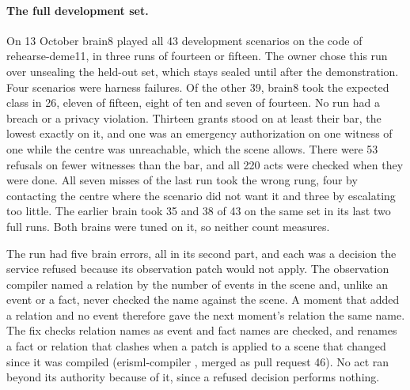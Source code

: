 \paragraph{The full development set.} On 13 October brain8 played all 43 development scenarios
on the code of rehearse-deme11, in three runs of fourteen or fifteen. The owner chose this run over
unsealing the held-out set, which stays sealed until after the demonstration. Four scenarios were
harness failures. Of the other 39, brain8 took the expected class in 26, eleven of fifteen, eight
of ten and seven of fourteen. No run had a breach or a privacy violation. Thirteen grants stood on
at least their bar, the lowest exactly on it, and one was an emergency authorization on one witness
of one while the centre was unreachable, which the scene allows. There were 53 refusals on fewer
witnesses than the bar, and all 220 acts were checked when they were done. All seven misses of the
last run took the wrong rung, four by contacting the centre where the scenario did not want it and
three by escalating too little. The earlier brain took 35 and 38 of 43 on the same set in its last
two full runs. Both brains were tuned on it, so neither count measures.

The run had five brain errors, all in its second part, and each was a decision the service refused
because its observation patch would not apply. The observation compiler named a relation by the
number of events in the scene and, unlike an event or a fact, never checked the name against the
scene. A moment that added a relation and no event therefore gave the next moment's relation the
same name. The fix checks relation names as event and fact names are checked, and renames a fact or
relation that clashes when a patch is applied to a scene that changed since it was compiled
(erisml-compiler , merged as pull request 46). No act ran beyond its authority because
of it, since a refused decision performs nothing.

